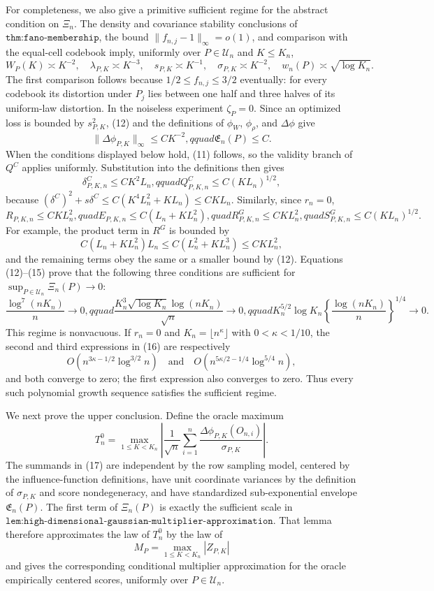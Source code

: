 For completeness, we also give a primitive sufficient regime for the abstract condition on \(\Xi_n\).  The density and covariance stability conclusions of \(\texttt{thm:fano-membership}\), the bound \(\|f_{n,j}-1\|_\infty=o(1)\), and comparison with the equal-cell codebook imply, uniformly over \(P\in\mathcal U_n\) and \(K\leq K_n\),
\[
 W_P(K)\asymp K^{-2},\quad
 \lambda_{P,K}\asymp K^{-3},\quad
 s_{P,K}\asymp K^{-1},\quad
 \sigma_{P,K}\asymp K^{-2},\quad
 w_n(P)\asymp\sqrt{\log K_n}.
 \tag{12}
\]
The first comparison follows because \(1/2\leq f_{n,j}\leq3/2\) eventually: for every codebook its distortion under \(P_j\) lies between one half and three halves of its uniform-law distortion.  In the noiseless experiment \(\zeta_P=0\).  Since an optimized loss is bounded by \(s_{P,K}^2\), (12) and the definitions of \(\phi_W\), \(\phi_\rho\), and \(\Delta\phi\) give
\[
 \|\Delta\phi_{P,K}\|_\infty\leq CK^{-2},qquad
 \mathfrak E_n(P)\leq C.
 \tag{13}
\]
When the conditions displayed below hold, (11) follows, so the validity branch of \(Q^C\) applies uniformly.  Substitution into the definitions then gives
\[
 \delta^C_{P,K,n}\leq CK^2L_n,qquad
 Q^C_{P,K,n}\leq C(KL_n)^{1/2},
 \tag{14}
\]
because \((\delta^C)^2+s\delta^C\leq C(K^4L_n^2+KL_n)\leq CKL_n\).  Similarly, since \(r_n=0\),
\[
 R_{P,K,n}\leq CKL_n^2,quad
 E_{P,K,n}\leq C(L_n+KL_n^2),quad
 R^G_{P,K,n}\leq CKL_n^2,quad
 S^G_{P,K,n}\leq C(KL_n)^{1/2}.
 \tag{15}
\]
For example, the product term in \(R^G\) is bounded by
\[
 C(L_n+KL_n^2)L_n\leq C(L_n^2+KL_n^3)\leq CKL_n^2,
\]
and the remaining terms obey the same or a smaller bound by (12).  Equations (12)--(15) prove that the following three conditions are sufficient for \(\sup_{P\in\mathcal U_n}\Xi_n(P)\to0\):
\[
 \frac{\log^7(nK_n)}{n}\longrightarrow0,qquad
 \frac{K_n^3\sqrt{\log K_n}\log(nK_n)}{\sqrt n}\longrightarrow0,qquad
 K_n^{5/2}\log K_n
 \left\{\frac{\log(nK_n)}{n}\right\}^{1/4}\longrightarrow0.
 \tag{16}
\]
This regime is nonvacuous.  If \(r_n=0\) and \(K_n=\lfloor n^\kappa\rfloor\) with \(0<\kappa<1/10\), the second and third expressions in (16) are respectively
\[
 O\!\left(n^{3\kappa-1/2}\log^{3/2}n\right)
 \quad\text{and}\quad
 O\!\left(n^{5\kappa/2-1/4}\log^{5/4}n\right),
\]
and both converge to zero; the first expression also converges to zero.  Thus every such polynomial growth sequence satisfies the sufficient regime.

We next prove the upper conclusion.  Define the oracle maximum
\[
 T_n^0=
 \max_{1\leq K<K_n}\left|
 \frac1{\sqrt n}\sum_{i=1}^n
 \frac{\Delta\phi_{P,K}(O_{n,i})}{\sigma_{P,K}}
 \right|.
 \tag{17}
\]
The summands in (17) are independent by the row sampling model, centered by the influence-function definitions, have unit coordinate variances by the definition of \(\sigma_{P,K}\) and score nondegeneracy, and have standardized sub-exponential envelope \(\mathfrak E_n(P)\).  The first term of \(\Xi_n(P)\) is exactly the sufficient scale in \(\texttt{lem:high-dimensional-gaussian-multiplier-approximation}\).  That lemma therefore approximates the law of \(T_n^0\) by the law of
\[
 M_P=\max_{1\leq K<K_n}|Z_{P,K}|
\]
and gives the corresponding conditional multiplier approximation for the oracle empirically centered scores, uniformly over \(P\in\mathcal U_n\).

